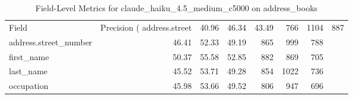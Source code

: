 \begin{table}
\caption{Field-Level Metrics for claude_haiku_4.5_medium_c5000 on address_books}
\label{tab:fields_claude_haiku_4.5_medium_c5000_address_books}
\begin{tabular}{lrrrrrr}
\toprule
Field & Precision (%
\midrule
address.street & 40.96 & 46.34 & 43.49 & 766 & 1104 & 887 \\
address.street_number & 46.41 & 52.33 & 49.19 & 865 & 999 & 788 \\
first_name & 50.37 & 55.58 & 52.85 & 882 & 869 & 705 \\
last_name & 45.52 & 53.71 & 49.28 & 854 & 1022 & 736 \\
occupation & 45.98 & 53.66 & 49.52 & 806 & 947 & 696 \\
\bottomrule
\end{tabular}
\end{table}
